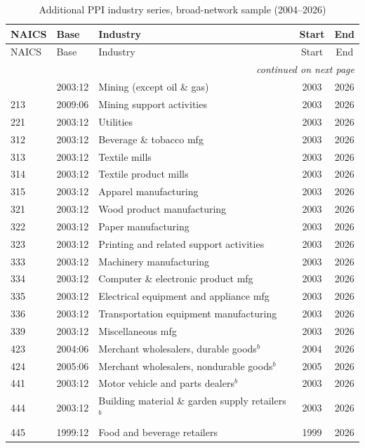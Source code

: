 {\footnotesize
\begin{longtable}{llp{5cm}cc}
\caption{Additional PPI industry series, broad-network sample (2004--2026)}\label{tab:broad}\\
\toprule
NAICS & Base & Industry & Start & End \\
\midrule
\endfirsthead
\toprule
NAICS & Base & Industry & Start & End \\
\midrule
\endhead
\midrule\multicolumn{5}{r}{\textit{continued on next page}}\\
\endfoot
\bottomrule
\endlastfoot
212 & 2003:12 & Mining (except oil \& gas) & 2003 & 2026 \\
213 & 2009:06 & Mining support activities & 2003 & 2026 \\
221 & 2003:12 & Utilities & 2003 & 2026 \\
312 & 2003:12 & Beverage \& tobacco mfg & 2003 & 2026 \\
313 & 2003:12 & Textile mills & 2003 & 2026 \\
314 & 2003:12 & Textile product mills & 2003 & 2026 \\
315 & 2003:12 & Apparel manufacturing & 2003 & 2026 \\
321 & 2003:12 & Wood product manufacturing & 2003 & 2026 \\
322 & 2003:12 & Paper manufacturing & 2003 & 2026 \\
323 & 2003:12 & Printing and related support activities & 2003 & 2026 \\
333 & 2003:12 & Machinery manufacturing & 2003 & 2026 \\
334 & 2003:12 & Computer \& electronic product mfg & 2003 & 2026 \\
335 & 2003:12 & Electrical equipment  and appliance mfg & 2003 & 2026 \\
336 & 2003:12 & Transportation equipment manufacturing & 2003 & 2026 \\
339 & 2003:12 & Miscellaneous mfg & 2003 & 2026 \\
423 & 2004:06 & Merchant wholesalers, durable goods$^{b}$ & 2004 & 2026 \\
424 & 2005:06 & Merchant wholesalers, nondurable goods$^{b}$ & 2005 & 2026 \\
441 & 2003:12 & Motor vehicle and parts dealers$^{b}$ & 2003 & 2026 \\
444 & 2003:12 & Building material \& garden supply retailers$^{b}$ & 2003 & 2026 \\
445 & 1999:12 & Food and beverage retailers & 1999 & 2026 \\

\end{longtable}}
